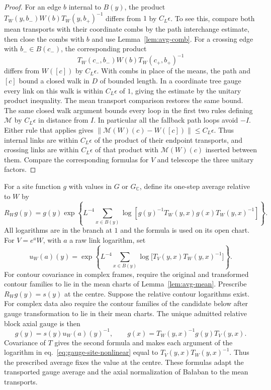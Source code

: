 \documentclass[11pt,letterpaper,reqno]{amsart}
\numberwithin{equation}{section}
\renewcommand{\eqref}[1]{\textup{eq.~\ref{#1}}}
\theoremstyle{definition}
\theoremstyle{remark}
\begin{document}
\begin{proof}
For an edge \(b\) internal to \(B(y)\), the product
\(T_W(y,b_-)W(b)T_W(y,b_+)^{-1}\) differs from \(1\) by \(C_L\epsilon\).
To see this, compare both mean transports with their coordinate combs
by the path interchange estimate, then close the combs with \(b\) and
use Lemma~\ref{lem:avg-comb}. For a crossing edge with
\(b_-\in B(c_-)\), the corresponding product
\[
 T_W(c_-,b_-)W(b)T_W(c_+,b_+)^{-1}
\]
differs from \(W([c])\) by \(C_L\epsilon\). With combs in place of the
means, the path and \([c]\) bound a closed walk in \(D\) of bounded
length. In a coordinate tree gauge every link on this walk is within
\(C_L\epsilon\) of \(1\), giving the estimate by the unitary product
inequality. The mean transport comparison restores the same bound.
The same closed walk argument bounds every loop in the first two
rules defining \(\mathcal M\) by \(C_L\epsilon\) in distance
from \(I\). In particular all the fallback path loops avoid \(-I\).
Either rule that applies gives
\(\|\mathcal M(W)(c)-W([c])\|\le C_L\epsilon\).
Thus internal links are within
\(C_L\epsilon\) of the product of their endpoint transports, and crossing
links are within \(C_L\epsilon\) of that product with
\(\mathcal M(W)(c)\) inserted between them. Compare the corresponding
formulas for \(V\) and telescope the three unitary factors.
\end{proof}

For a site function \(g\) with values in \(G\) or \(G_{\mathbb C}\), define
its one-step average relative to \(W\) by
\begin{equation}\label{eq:gauge-site-nonlinear}
 R_Wg(y)=g(y)\exp\!\left\{L^{-4}\sum_{x\in B(y)}
 \log\!\left[g(y)^{-1}T_W(y,x)g(x)T_W(y,x)^{-1}\right]\right\}.
\end{equation}
All logarithms are in the branch at \(1\) and the formula is used on
its open chart. For \(V=e^aW\), with \(a\) a raw link logarithm, set
\begin{equation}\label{eq:gauge-block-factor}
 u_W(a)(y)=\exp\!\left\{L^{-4}\sum_{x\in B(y)}
 \log\big[T_V(y,x)T_W(y,x)^{-1}\big]\right\}.
\end{equation}
For contour covariance in complex frames, require the original and
transformed contour families to lie in the mean charts of
Lemma~\ref{lem:avg-mean}.
Prescribe \(R_Wg(y)=s(y)\) at the centre. Suppose the relative contour
logarithms exist. For complex data also require the contour families
of the candidate below after gauge transformation to lie in their
mean charts. The unique admitted relative block axial gauge is then
\begin{equation}\label{eq:gauge-relative-axial}
 g(y)=s(y)u_W(a)(y)^{-1},\qquad
 g(x)=T_W(y,x)^{-1}g(y)T_V(y,x).
\end{equation}
Covariance of \(T\) gives the second formula and makes each argument of
the logarithm in \eqref{eq:gauge-site-nonlinear} equal to
\(T_V(y,x)T_W(y,x)^{-1}\). Thus the prescribed average fixes the value
at the centre. These formulas adapt the transported gauge average and
the axial normalization of Ba{\l}aban
\cite[(78)--(92)]{Bal85a}\cite[\S B]{Bal85g} to the mean transports.
\end{document}

